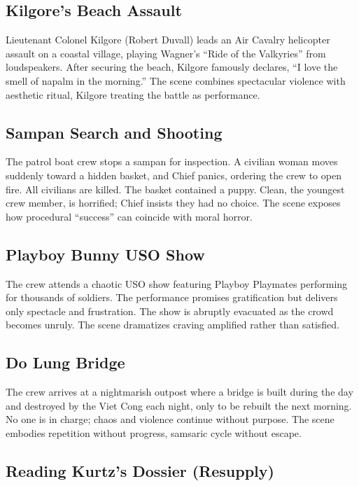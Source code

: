 \subsection*{Kilgore's Beach Assault}
\label{scene:kilgore-beach}

Lieutenant Colonel Kilgore (Robert Duvall) leads an Air Cavalry helicopter assault on a coastal
village, playing Wagner's ``Ride of the Valkyries'' from loudspeakers. After securing the
beach, Kilgore famously declares, ``I love the smell of napalm in the morning.'' The scene
combines spectacular violence with aesthetic ritual, Kilgore treating the battle as
performance.

\subsection*{Sampan Search and Shooting}
\label{scene:sampan}

The patrol boat crew stops a sampan for inspection. A civilian woman moves suddenly toward a
hidden basket, and Chief panics, ordering the crew to open fire. All civilians are killed. The
basket contained a puppy. Clean, the youngest crew member, is horrified; Chief insists they
had no choice. The scene exposes how procedural ``success'' can coincide with moral horror.

\subsection*{Playboy Bunny USO Show}
\label{scene:playboy-show}

The crew attends a chaotic USO show featuring Playboy Playmates performing for thousands of
soldiers. The performance promises gratification but delivers only spectacle and frustration.
The show is abruptly evacuated as the crowd becomes unruly. The scene dramatizes craving
amplified rather than satisfied.

\subsection*{Do Lung Bridge}
\label{scene:do-lung-bridge}

The crew arrives at a nightmarish outpost where a bridge is built during the day and destroyed
by the Viet Cong each night, only to be rebuilt the next morning. No one is in charge; chaos
and violence continue without purpose. The scene embodies repetition without progress, samsaric
cycle without escape.

\subsection*{Reading Kurtz's Dossier (Resupply)}
\label{scene:dossier-reading}

